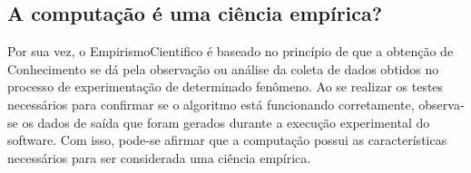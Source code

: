 \subsection{A computação é uma ciência empírica? }

Por sua vez, o \gls{EmpirismoCientifico} é baseado no princípio de que a obtenção de \gls{Conhecimento} se dá pela observação ou análise da coleta de dados obtidos no processo de experimentação de determinado fenômeno. Ao se realizar os testes necessários para confirmar se o algoritmo está funcionando corretamente, observa-se os dados de saída que foram gerados durante a execução experimental do software. Com isso, pode-se afirmar que a computação possui as características necessários para ser considerada uma ciência empírica.